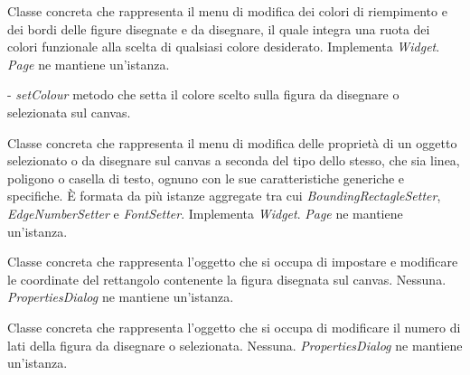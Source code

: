 Classe concreta che rappresenta il menu di modifica dei colori di riempimento e dei bordi delle figure disegnate e da disegnare, il quale integra una ruota dei colori funzionale alla scelta di qualsiasi colore desiderato.
Implementa \textit{Widget}.
\textit{Page} ne mantiene un'istanza.
\begin{elencopuntato}[\normindent]
\item[-]  \textit{setColour} metodo che setta il colore scelto sulla figura da disegnare o selezionata sul canvas.
\end{elencopuntato}

Classe concreta che rappresenta  il menu di modifica delle propriet\` a di un oggetto selezionato o da disegnare sul canvas a seconda del tipo dello stesso, che sia linea, poligono o casella di testo, ognuno con le sue caratteristiche generiche e specifiche.
\`E formata da pi\`u istanze aggregate tra cui \textit{BoundingRectagleSetter}, \textit{EdgeNumberSetter} e \textit{FontSetter}. Implementa \textit{Widget}.
\textit{Page} ne mantiene un'istanza.

Classe concreta che rappresenta l'oggetto che si occupa di impostare e modificare le coordinate del rettangolo contenente la figura disegnata sul canvas.
Nessuna.
\textit{PropertiesDialog} ne mantiene un'istanza.

Classe concreta che rappresenta l'oggetto che si occupa di modificare il numero di lati della figura da disegnare o selezionata.
Nessuna.
\textit{PropertiesDialog} ne mantiene un'istanza.

